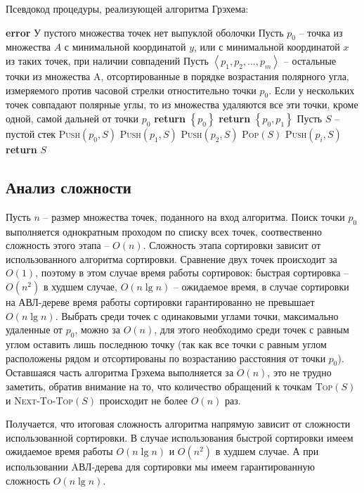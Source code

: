 \noindent Псевдокод процедуры, реализующей алгоритма Грэхема:
\begin{algorithmic}[1]
			\State \textbf{error} У пустого множества точек нет выпуклой оболочки
		\EndIf
		\State Пусть $p_0$ -- точка из множества $A$ с минимальной координатой $y$, или с минимальной координатой $x$ из таких точек, при наличии совпадений
		\State Пусть $\left\langle p_1, p_2, \dots, p_m\right\rangle $ -- остальные точки из множества A, отсортированные в порядке возрастания полярного угла, измеряемого против часовой стрелки отностительно точки $p_0$. Если у нескольких точек совпадают полярные углы, то из множества удаляются все эти точки, кроме одной, самой дальней от точки $p_0$
			\State \textbf{return} $\left\lbrace p_0\right\rbrace $
			\State \textbf{return} $\left\lbrace p_0, p_1\right\rbrace $
		\Else
			\State Пусть $S$ -- пустой стек
			\State \textsc{Push}$(p_0, S)$
			\State \textsc{Push}$(p_1, S)$
			\State \textsc{Push}$(p_2, S)$
					\State \textsc{Pop}$(S)$
				\EndWhile
				\State \textsc{Push}$(p_i, S)$
			\EndFor
			\State \textbf{return} $S$
		\EndIf
	\EndProcedure
\end{algorithmic}

\newpage

\subsection{Анализ сложности}

Пусть $n$ -- размер множества точек, поданного на вход алгоритма. Поиск точки $p_0$ выполняется однократным проходом по списку всех точек, соотвественно сложность этого этапа -- $O(n)$. Сложность этапа сортировки зависит от использованного алгоритма сортировки. Сравнение двух точек происходит за $O(1)$, поэтому в этом случае время работы сортировок: быстрая сортировка -- $O(n^2)$ в худшем случае, $O(n\lg n)$ -- ожидаемое время, в случае сортировки на АВЛ-дереве время работы сортировки гарантированно не превышает $O(n\lg n)$. Выбрать среди точек с одинаковыми углами точки, максимально удаленные от $p_0$, можно за $O(n)$, для этого необходимо среди точек с равным углом оставить лишь последнюю точку (так как все точки с равным углом расположены рядом и отсортированы по возрастанию расстояния от точки $p_0$). Оставшаяся часть алгоритма Грэхема выполняется за $O(n)$, это не трудно заметить, обратив внимание на то, что количество обращений к точкам \textsc{Top}$(S)$ и \textsc{Next-To-Top}$(S)$ происходит не более $O(n)$ раз.

Получается, что итоговая сложность алгоритма напрямую зависит от сложности использованной сортировки. В случае использования быстрой сортировки имеем ожидаемое время работы $O(n\lg n)$ и $O(n^2)$ в худшем случае. А при использовании AВЛ-дерева для сортировки мы имеем гарантированную сложность $O(n\lg n)$.

\newpage
